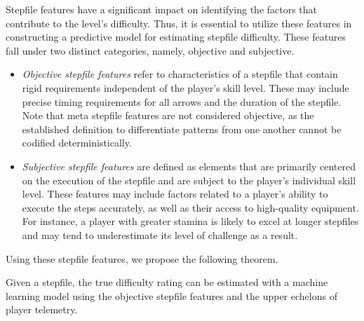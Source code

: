 \vspace{2mm}

Stepfile features have a significant impact on identifying the factors that contribute to the level's difficulty. Thus, it is essential to utilize these features in constructing a predictive model for estimating stepfile difficulty. These features fall under two distinct categories, namely, objective and subjective.

\begin{itemize}
    \item \textit{Objective stepfile features} refer to characteristics of a stepfile that contain rigid requirements independent of the player's skill level. These may include precise timing requirements for all arrows and the duration of the stepfile. Note that meta stepfile features are not considered objective, as the established definition to differentiate patterns from one another cannot be codified deterministically. 
    \item \textit{Subjective stepfile features} are defined as elements that are primarily centered on the execution of the stepfile and are subject to the player's individual skill level. These features may include factors related to a player's ability to execute the steps accurately, as well as their access to high-quality equipment. For instance, a player with greater stamina is likely to excel at longer stepfiles and may tend to underestimate its level of challenge as a result. 
\end{itemize}

Using these stepfile features, we propose the following theorem.

\begin{theorem}
Given a stepfile, the true difficulty rating can be estimated with a machine learning model using the objective stepfile features and the upper echelons of player telemetry.
\end{theorem}

